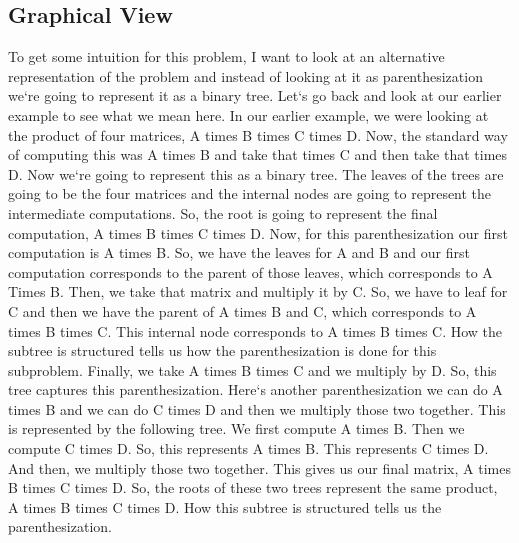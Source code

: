 \subsection{Graphical View}
To get some intuition for this problem, I want to look at an alternative representation of the problem and instead of looking at it as parenthesization we`re going to represent it as a binary tree.
Let`s go back and look at our earlier example to see what we mean here.
In our earlier example, we were looking at the product of four matrices, A times B times C times D\@.
Now, the standard way of computing this was A times B and take that times C and then take that times D\@.
Now we`re going to represent this as a binary tree.
The leaves of the trees are going to be the four matrices and the internal nodes are going to represent the intermediate computations.
So, the root is going to represent the final computation, A times B times C times D\@.
Now, for this parenthesization our first computation is A times B\@.
So, we have the leaves for A and B and our first computation corresponds to the parent of those leaves, which corresponds to A Times B\@.
Then, we take that matrix and multiply it by C\@.
So, we have to leaf for C and then we have the parent of A times B and C, which corresponds to A times B times C\@.
This internal node corresponds to A times B times C\@.
How the subtree is structured tells us how the parenthesization is done for this subproblem.
Finally, we take A times B times C and we multiply by D\@.
So, this tree captures this parenthesization.
Here`s another parenthesization we can do A times B and we can do C times D and then we multiply those two together.
This is represented by the following tree.
We first compute A times B\@.
Then we compute C times D\@.
So, this represents A times B\@.
This represents C times D\@.
And then, we multiply those two together.
This gives us our final matrix, A times B times C times D\@.
So, the roots of these two trees represent the same product, A times B times C times D\@.
How this subtree is structured tells us the parenthesization.

